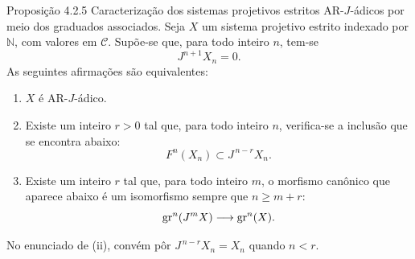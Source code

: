\begin{statement}{Proposição 4.2.5}
Caracterização dos sistemas projetivos estritos AR-\(J\)-ádicos por meio dos graduados associados. Seja \(X\) um sistema projetivo estrito indexado por \(\mathbb N\), com valores em \(\mathcal C\). Supõe-se que, para todo inteiro \(n\), tem-se
\[
J^{n+1}X_n=0.
\]
As seguintes afirmações são equivalentes:
\begin{enumerate}[label=\textup{(\roman*)}]
\item \(X\) é AR-\(J\)-ádico.
\item Existe um inteiro \(r>0\) tal que, para todo inteiro \(n\), verifica-se a inclusão que se encontra abaixo:
\[
F^n(X_n)\subset J^{\,n-r}X_n.
\]
\item Existe um inteiro \(r\) tal que, para todo inteiro \(m\), o morfismo canônico que aparece abaixo é um isomorfismo sempre que \(n\ge m+r\):
\[
\operatorname{gr}^n(J^mX)\longrightarrow \operatorname{gr}^n(X).
\]
\end{enumerate}
No enunciado de (ii), convém pôr \(J^{\,n-r}X_n=X_n\) quando \(n<r\).
\end{statement}
